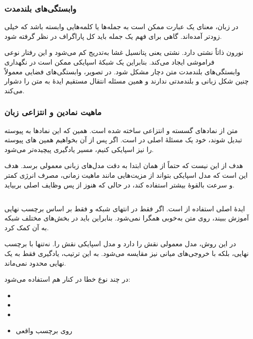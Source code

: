 \subsubsection{وابستگی‌های بلندمدت}
در زبان، معنای یک عبارت ممکن است به جمله‌ها یا کلمه‌هایی وابسته باشد که خیلی زودتر آمده‌اند. گاهی برای فهم یک جمله باید کل  پاراگراف در نظر گرفته شود.

نورون  ذاتاً نشتی دارد. نشتی یعنی پتانسیل غشا به‌تدریج کم می‌شود و این رفتار نوعی فراموشی ایجاد می‌کند. بنابراین یک شبکهٔ اسپایکی ممکن است در نگهداری وابستگی‌های بلندمدت متن دچار مشکل شود. در تصویر، وابستگی‌های فضایی معمولاً چنین شکل زبانی و بلندمدتی ندارند و همین مسئله انتقال مستقیم ایدهٔ  به متن را دشوار می‌کند.

\subsubsection{ماهیت نمادین و انتزاعی زبان}
متن از نمادهای گسسته و انتزاعی ساخته شده است. همین که این نمادها به  پیوسته تبدیل شوند، خود یک مسئلهٔ اصلی در  است. اگر پس از آن بخواهیم همین های پیوسته را نیز اسپایکی کنیم، مسیر یادگیری پیچیده‌تر می‌شود.

هدف از  این نیست که حتماً از همان ابتدا به دقت مدل‌های زبانی معمولی برسد. هدف این است که مدل اسپایکی بتواند از مزیت‌هایی مانند ماهیت زمانی، مصرف انرژی کمتر و سرعت بالقوهٔ بیشتر استفاده کند، در حالی که هنوز از پس وظایف اصلی  بربیاید.

\subsection{}
ایدهٔ اصلی  استفاده از  است. اگر  فقط در انتهای شبکه و فقط بر اساس برچسب نهایی آموزش ببیند، روی متن به‌خوبی همگرا نمی‌شود. بنابراین باید در بخش‌های مختلف شبکه به آن کمک کرد.

در این روش، مدل معمولی  نقش  را دارد و مدل اسپایکی  نقش  را.  نه‌تنها با برچسب نهایی، بلکه با خروجی‌های میانی  نیز مقایسه می‌شود. به این ترتیب، یادگیری فقط به یک  نهایی محدود نمی‌ماند.

در  چند نوع خطا در کنار هم استفاده می‌شود:

\begin{itemize}
  \item {}
  \item {}
  \item {}
  \item {} روی برچسب واقعی
\end{itemize}

